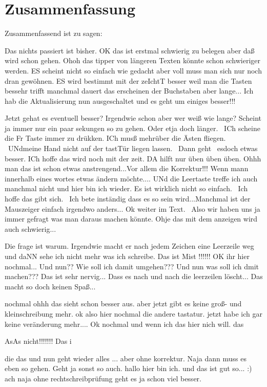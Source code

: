 \chapter{Zusammenfassung}

Zusammenfassend ist zu sagen:

Das nichts passiert ist bisher. OK das ist erstmal schwierig zu belegen aber daß wird schon gehen. Ohoh das tipper von längeren Texten könnte schon schwieriger werden. ES scheint nicht so einfach wie gedacht aber voll muss man sich nur noch dran gewöhnen. ES wird bestimmt mit der zeIchtT besser weil man die Tasten bessehr trifft manchmal dauert das erscheinen der Buchstaben aber lange...  Ich hab die Aktualisierung nun ausgeschaltet und es geht um einiges besser!!!  

Jetzt gehat es eventuell besser? Irgendwie schon aber wer weiß wie lange? Scheint ja immer nur ein paar sekungen so zu gehen. Oder etja doch länger.  ICh scheine die Fr Taste immer zu drükken. ICh musß mehrüber die Ästen fliegen.  UNdmeine Hand nicht auf der tastTür liegen lassen.  Dann geht  esdoch etwas besser. ICh hoffe das wird noch mit der zeit. DA hilft nur üben üben üben. Ohhh man das ist schon etwas anstrengend...Vor allem die Korrektur!!! Wenn mann innerhalb eines wortes etwas ändern möchte.... UNd die Leertaste treffe ich auch manchmal nicht und hier bin ich wieder. Es ist wirklich nicht so einfach.  Ich hoffe das gibt sich.  Ich bete inständig dass es so sein wird...Manchmal ist der Mauszeiger einfach irgendwo anders... Ok weiter im Text.  Also wir haben uns ja immer gefragt was man daraus machen könnte. 
Ohje das mit dem anzeigen wird auch schwierig... 

Die frage ist warum. Irgendwie macht er nach jedem Zeichen eine Leerzeile weg und daNN sehe ich nicht mehr was ich schreibe. Das ist Mist !!!!!! OK ihr hier nochmal... Und nun?? Wie soll ich damit umgehen??? Und nun was soll ich dmit machen??? Das ist sehr nervig... Dass es nach und nach die leerzeilen löscht... Das macht so doch keinen Spaß... 


nochmal ohhh das sieht schon besser aus. aber jetzt gibt es keine groß- und kleinschreibung mehr. ok also hier nochmal die andere tastatur. jetzt habe ich gar keine veränderung mehr....
Ok nochmal und wenn ich das hier nich will.
 das 
 
 AsAs nicht!!!!!!! Das  i
 
  die das  und nun geht wieder alles ... aber ohne korrektur. Naja dann muss es eben so gehen. Geht ja sonst so auch. hallo hier bin ich. und das ist gut so... :) ach naja ohne rechtschreibprüfung geht es ja schon viel besser. 
 

